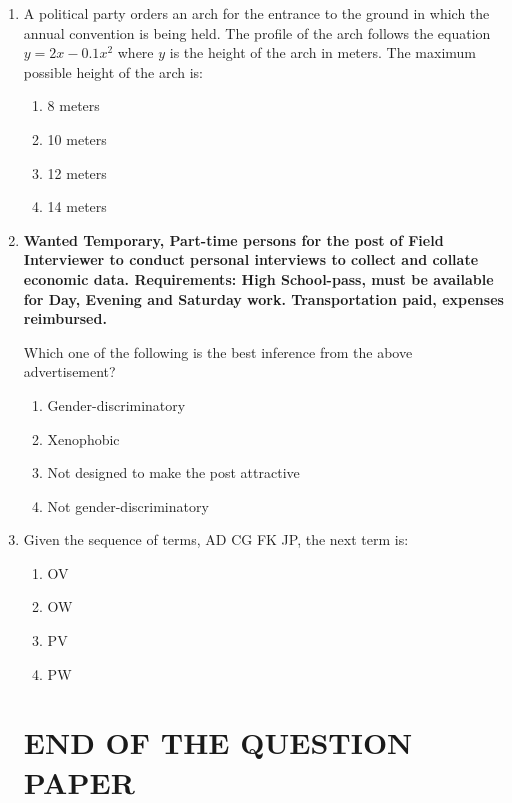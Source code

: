 \documentclass[journal,12pt,onecolumn]{IEEEtran}
\theoremstyle{remark}
\begin{document}
\begin{enumerate}
The probability that a randomly chosen shock absorber, which is found to be reliable, is made by Y is:
\begin{multicols}{4}
\begin{enumerate}
    \item 0.288
    \item 0.334
    \item 0.667
    \item 0.720
\end{enumerate}
\end{multicols}

\item A political party orders an arch for the entrance to the ground in which the annual convention is being held. The profile of the arch follows the equation $y = 2x - 0.1x^2$ where $y$ is the height of the arch in meters. The maximum possible height of the arch is:
\begin{multicols}{2}
\begin{enumerate}[label=\Alph*)]
    \item 8 meters
    \item 10 meters
    \item 12 meters
    \item 14 meters
\end{enumerate}
\end{multicols}

\item \textbf{Wanted Temporary, Part-time persons for the post of Field Interviewer to conduct personal interviews to collect and collate economic data. Requirements: High School-pass, must be available for Day, Evening and Saturday work. Transportation paid, expenses reimbursed.} 

Which one of the following is the best inference from the above advertisement?

\begin{enumerate}
    \item Gender-discriminatory
    \item Xenophobic
    \item Not designed to make the post attractive
    \item Not gender-discriminatory
\end{enumerate}


\item Given the sequence of terms, AD \quad CG \quad FK \quad JP, the next term is:
\begin{multicols}{4}
\begin{enumerate}
    \item OV
    \item OW
    \item PV
    \item PW
\end{enumerate}
\end{multicols}


\section*{END OF THE QUESTION PAPER}
\end{enumerate}

 
\end{document}
